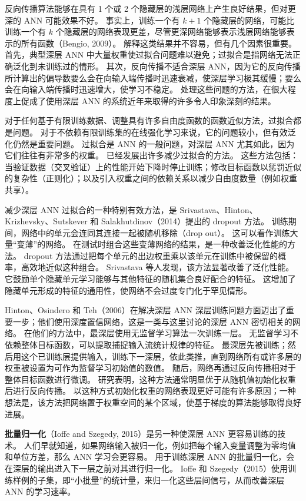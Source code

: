 \documentclass[UTF8,12pt,a4paper,fontset=fandol]{ctexart}
\begin{document}
反向传播算法能够在具有 1 个或 2 个隐藏层的浅层网络上产生良好结果，但对更深的 ANN 可能效果不好。
事实上，训练一个有 $k+1$ 个隐藏层的网络，可能比训练一个有 $k$ 个隐藏层的网络表现更差，尽管更深网络能够表示浅层网络能够表示的所有函数（Bengio, 2009）。
解释这类结果并不容易，但有几个因素很重要。
首先，典型深层 ANN 中大量权重使过拟合问题难以避免；过拟合是指网络无法正确泛化到未训练过的情形。
其次，反向传播不适合深层 ANN，因为它的反向传播所计算出的偏导数要么会在向输入端传播时迅速衰减，使深层学习极其缓慢；要么会在向输入端传播时迅速增大，使学习不稳定。
处理这些问题的方法，在很大程度上促成了使用深层 ANN 的系统近年来取得的许多令人印象深刻的结果。

对于任何基于有限训练数据、调整具有许多自由度函数的函数近似方法，过拟合都是问题。
对于不依赖有限训练集的在线强化学习来说，它的问题较小，但有效泛化仍然是重要问题。
过拟合是 ANN 的一般问题，对深层 ANN 尤其如此，因为它们往往有非常多的权重。
已经发展出许多减少过拟合的方法。
这些方法包括：当验证数据（交叉验证）上的性能开始下降时停止训练；修改目标函数以惩罚近似的复杂性（正则化）；以及引入权重之间的依赖关系以减少自由度数量（例如权重共享）。

减少深层 ANN 过拟合的一种特别有效方法，是 Srivastava、Hinton、Krizhevsky、Sutskever 和 Salakhutdinov（2014）提出的 dropout 方法。
训练期间，网络中的单元会连同其连接一起被随机移除（drop out）。
这可以看作训练大量“变薄”的网络。
在测试时组合这些变薄网络的结果，是一种改善泛化性能的方法。
dropout 方法通过把每个单元的出边权重乘以该单元在训练中被保留的概率，高效地近似这种组合。
Srivastava 等人发现，该方法显著改善了泛化性能。
它鼓励单个隐藏单元学习能够与其他特征的随机集合良好配合的特征。
这增加了隐藏单元形成的特征的通用性，使网络不会过度专门化于罕见情形。

Hinton、Osindero 和 Teh（2006）在解决深层 ANN 深层训练问题方面迈出了重要一步；他们使用深度置信网络，这是一类与这里讨论的深层 ANN 密切相关的网络。
在他们的方法中，最深层使用无监督学习算法一次训练一层。
无监督学习不依赖整体目标函数，可以提取捕捉输入流统计规律的特征。
最深层先被训练；然后用这个已训练层提供输入，训练下一深层，依此类推，直到网络所有或许多层的权重被设置为可作为监督学习初始值的数值。
随后，网络再通过反向传播相对于整体目标函数进行微调。
研究表明，这种方法通常明显优于从随机值初始化权重后进行反向传播。
以这种方式初始化权重的网络表现更好可能有许多原因；一种想法是，该方法把网络置于权重空间的某个区域，使基于梯度的算法能够取得良好进展。

\textbf{批量归一化}（Ioffe and Szegedy, 2015）是另一种使深层 ANN 更容易训练的技术。
人们早就知道，如果网络输入被归一化，例如把每个输入变量调整为零均值和单位方差，那么 ANN 学习会更容易。
用于训练深层 ANN 的批量归一化，会在深层的输出进入下一层之前对其进行归一化。
Ioffe 和 Szegedy（2015）使用训练样例的子集，即“小批量”的统计量，来归一化这些层间信号，从而改善深层 ANN 的学习速率。
\end{document}

